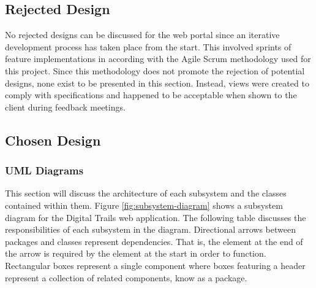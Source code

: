 \documentclass[11pt,a4paper]{report}
\begin{document}
\subsection{Rejected Design}
\label{sec:portal-rejected-design}

No rejected designs can be discussed for the web portal since an iterative development process has taken place from the start. This involved sprints of feature implementations in according with the Agile Scrum methodology used for this project. Since this methodology does not promote the rejection of potential designs, none exist to be presented in this section. Instead, views were created to comply with specifications and happened to be acceptable when shown to the client during feedback meetings.

\subsection{Chosen Design}
\label{sec:portal-chosen-design}

\subsubsection{UML Diagrams}

This section will discuss the architecture of each subsystem and the classes contained within them. Figure \ref{fig:subsystem-diagram} shows a subsystem diagram for the Digital Trails web application. The following table discusses the responsibilities of each subsystem in the diagram. Directional arrows between packages and classes represent dependencies. That is, the element at the end of the arrow is required by the element at the start in order to function. Rectangular boxes represent a single component where boxes featuring a header represent a collection of related components, know as a package.
\end{document}
